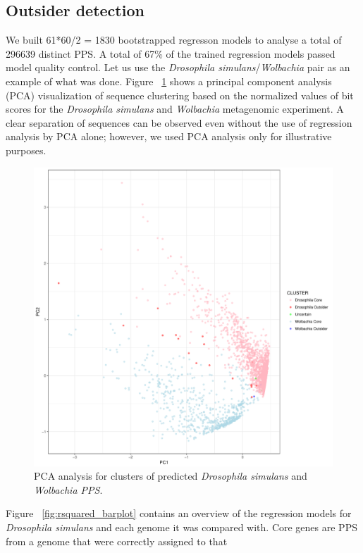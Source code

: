 \subsection{Outsider detection}
\label{outsider_detection}
We built 61*60/2 = 1830 bootstrapped regresson models to analyse a total of
296639 distinct PPS. A total of 67\% of the trained regression models passed
model quality control. Let us use the \textit{Drosophila
simulans}/\textit{Wolbachia} pair as an example of what was done. Figure
~\ref{fig:pca_analysis} shows a principal component analysis (PCA)
visualization of sequence clustering based on the normalized values of bit
scores for the \textit{Drosophila simulans} and \textit{Wolbachia} metagenomic
experiment. A clear separation of sequences can be observed even without the
use of regression analysis by PCA alone; however, we used PCA analysis only for
illustrative purposes.
\begin{center}
\begin{figure}
\includegraphics[width=12cm]{figures/w_eds_vs_ds_bootstrapped_pc1_pc2.pdf}
\caption{PCA analysis for clusters of predicted \textit{Drosophila simulans}
	and \textit{Wolbachia PPS}.}
\label{fig:pca_analysis}
\end{figure}
\end{center}
Figure ~\ref{fig:rsquared_barplot} contains an overview of the regression
models for \textit{Drosophila simulans} and each genome it was compared with.
Core genes are PPS from a genome that were correctly assigned to that
